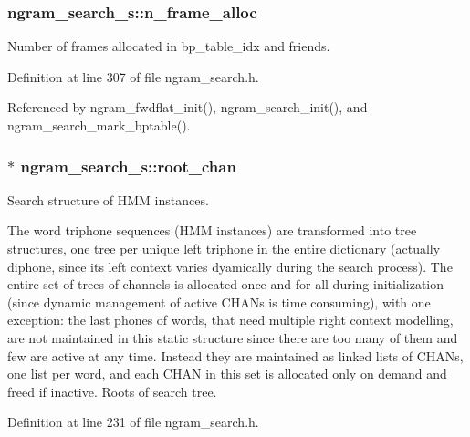 \subsubsection[{n\-\_\-frame\-\_\-alloc}]{ {\bf ngram\-\_\-search\-\_\-s\-::n\-\_\-frame\-\_\-alloc}}\label{structngram__search__s_a38ea5de504b3d7ad2390a3f8966d502f}


\-Number of frames allocated in bp\-\_\-table\-\_\-idx and friends. 



\-Definition at line 307 of file ngram\-\_\-search.\-h.



\-Referenced by ngram\-\_\-fwdflat\-\_\-init(), ngram\-\_\-search\-\_\-init(), and ngram\-\_\-search\-\_\-mark\-\_\-bptable().

\subsubsection[{root\-\_\-chan}]{$\ast$ {\bf ngram\-\_\-search\-\_\-s\-::root\-\_\-chan}}\label{structngram__search__s_ae1b0a51cfcddc1e4b6ac94fa1e48887a}


\-Search structure of \-H\-M\-M instances. 

\-The word triphone sequences (\-H\-M\-M instances) are transformed into tree structures, one tree per unique left triphone in the entire dictionary (actually diphone, since its left context varies dyamically during the search process). \-The entire set of trees of channels is allocated once and for all during initialization (since dynamic management of active \-C\-H\-A\-Ns is time consuming), with one exception\-: the last phones of words, that need multiple right context modelling, are not maintained in this static structure since there are too many of them and few are active at any time. \-Instead they are maintained as linked lists of \-C\-H\-A\-Ns, one list per word, and each \-C\-H\-A\-N in this set is allocated only on demand and freed if inactive. \-Roots of search tree. 

\-Definition at line 231 of file ngram\-\_\-search.\-h.




